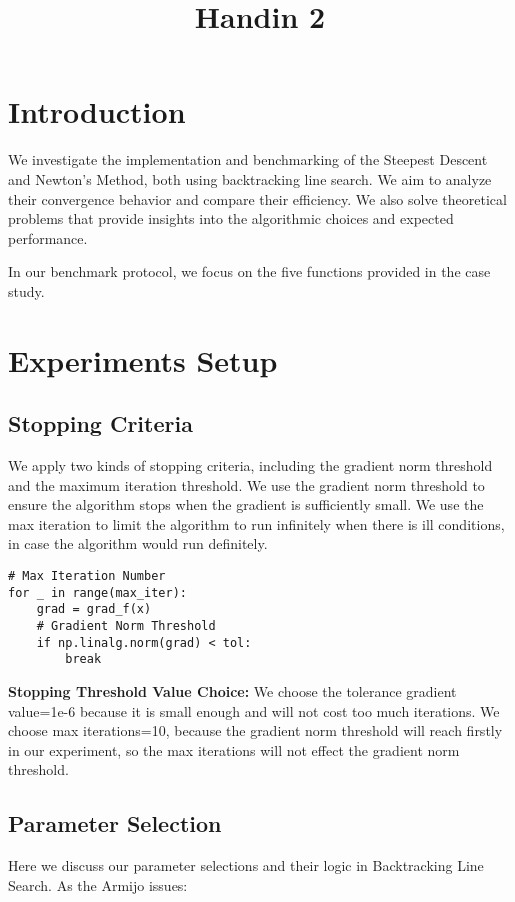 \documentclass[12pt]{article}
\title{Handin 2}
\begin{document}
\maketitle

\section{Introduction}

We investigate the implementation and benchmarking of the Steepest Descent and Newton's Method, both using backtracking line search. We aim to analyze their convergence behavior and compare their efficiency.  We also solve theoretical problems that provide insights into the algorithmic choices and expected performance. 

In our benchmark protocol, we focus on the five functions provided in the case study. 

\section{Experiments Setup}

\subsection{Stopping Criteria}
We apply two kinds of stopping criteria, including the gradient norm threshold and the maximum iteration threshold. We use the gradient norm threshold to ensure the algorithm stops when the gradient is sufficiently small. We use the max iteration to limit the algorithm to run infinitely when there is ill conditions, in case the algorithm would run definitely.

\begin{lstlisting}
# Max Iteration Number
for _ in range(max_iter): 
    grad = grad_f(x)
    # Gradient Norm Threshold 
    if np.linalg.norm(grad) < tol:
        break
\end{lstlisting}

\textbf{Stopping Threshold Value Choice: }We choose the tolerance gradient value=1e-6 because it is small enough and will not cost too much iterations. We choose max iterations=10, because the gradient norm threshold will reach firstly in our experiment, so the max iterations will not effect the gradient norm threshold. 

\subsection{Parameter Selection }
Here we discuss our parameter selections and their logic in Backtracking Line Search. As the Armijo issues:
\end{document}
